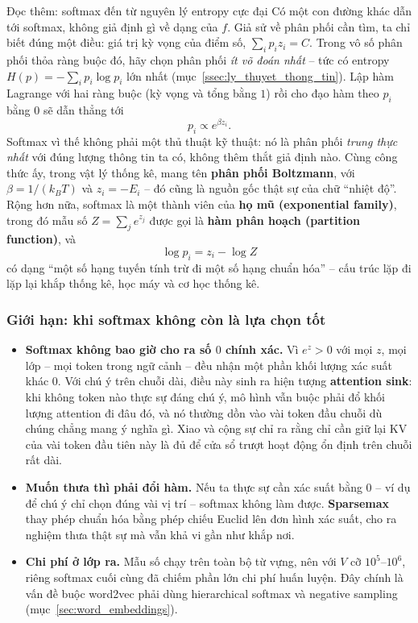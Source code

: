 \begin{deepdive}{Đọc thêm: softmax đến từ nguyên lý entropy cực đại}
Có một con đường khác dẫn tới softmax, không giả định gì về dạng của $f$. Giả sử về phân phối cần tìm, ta chỉ biết đúng một điều: giá trị kỳ vọng của điểm số, $\sum_i p_i z_i = C$. Trong vô số phân phối thỏa ràng buộc đó, hãy chọn phân phối \emph{ít võ đoán nhất} -- tức có entropy $H(p) = -\sum_i p_i \log p_i$ lớn nhất (mục~\ref{ssec:ly_thuyet_thong_tin}). Lập hàm Lagrange với hai ràng buộc (kỳ vọng và tổng bằng $1$) rồi cho đạo hàm theo $p_i$ bằng $0$ sẽ dẫn thẳng tới
\[
p_i \propto e^{\beta z_i} .
\]
Softmax vì thế không phải một thủ thuật kỹ thuật: nó là phân phối \emph{trung thực nhất} với đúng lượng thông tin ta có, không thêm thắt giả định nào. Cùng công thức ấy, trong vật lý thống kê, mang tên \textbf{phân phối Boltzmann}, với $\beta = 1/(k_B T)$ và $z_i = -E_i$ -- đó cũng là nguồn gốc thật sự của chữ “nhiệt độ”. Rộng hơn nữa, softmax là một thành viên của \textbf{họ mũ (exponential family)}, trong đó mẫu số $Z = \sum_j e^{z_j}$ được gọi là \textbf{hàm phân hoạch (partition function)}, và
\[
\log p_i = z_i - \log Z
\]
có dạng “một số hạng tuyến tính trừ đi một số hạng chuẩn hóa” -- cấu trúc lặp đi lặp lại khắp thống kê, học máy và cơ học thống kê.
\end{deepdive}

\subsubsection{Giới hạn: khi softmax không còn là lựa chọn tốt}
\begin{itemize}
    \item \textbf{Softmax không bao giờ cho ra số $0$ chính xác.} Vì $e^z > 0$ với mọi $z$, mọi lớp -- mọi token trong ngữ cảnh -- đều nhận một phần khối lượng xác suất khác $0$. Với chú ý trên chuỗi dài, điều này sinh ra hiện tượng \textbf{attention sink}: khi không token nào thực sự đáng chú ý, mô hình vẫn buộc phải đổ khối lượng attention đi đâu đó, và nó thường dồn vào vài token đầu chuỗi dù chúng chẳng mang ý nghĩa gì. Xiao và cộng sự \cite{xiao2023streaming} chỉ ra rằng chỉ cần giữ lại KV của vài token đầu tiên này là đủ để cửa sổ trượt hoạt động ổn định trên chuỗi rất dài.
    \item \textbf{Muốn thưa thì phải đổi hàm.} Nếu ta thực sự cần xác suất bằng $0$ -- ví dụ để chú ý chỉ chọn đúng vài vị trí -- softmax không làm được. \textbf{Sparsemax} \cite{martins2016softmax} thay phép chuẩn hóa bằng phép chiếu Euclid lên đơn hình xác suất, cho ra nghiệm thưa thật sự mà vẫn khả vi gần như khắp nơi.
    \item \textbf{Chi phí ở lớp ra.} Mẫu số chạy trên toàn bộ từ vựng, nên với $V$ cỡ $10^5$--$10^6$, riêng softmax cuối cùng đã chiếm phần lớn chi phí huấn luyện. Đây chính là vấn đề buộc word2vec phải dùng hierarchical softmax và negative sampling (mục~\ref{sec:word_embeddings}).
\end{itemize}


